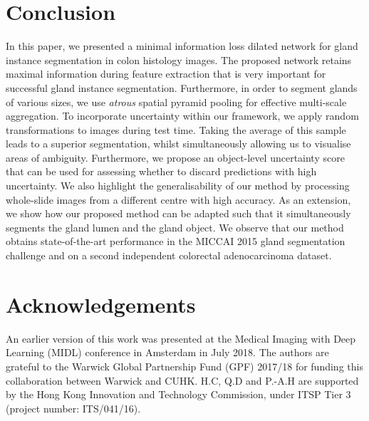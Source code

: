 \documentclass[3p]{elsarticle}
\begin{document}
\section{Conclusion}
In this paper, we presented a minimal information loss dilated network for gland instance segmentation in colon histology images. The proposed network retains maximal information during feature extraction that is very important for successful gland instance segmentation. Furthermore, in order to segment glands of various sizes, we use \textit{atrous} spatial pyramid pooling for effective multi-scale aggregation. To incorporate uncertainty within our framework, we apply random transformations to images during test time. Taking the average of this sample leads to a superior segmentation, whilst simultaneously allowing us to visualise areas of ambiguity. Furthermore, we propose an object-level uncertainty score that can be used for assessing whether to discard predictions with high uncertainty. We also highlight the generalisability of our method by processing whole-slide images from a different centre with high accuracy. As an extension, we show how our proposed method can be adapted such that it simultaneously segments the gland lumen and the gland object. 
We observe that our method obtains state-of-the-art performance in the MICCAI 2015 gland segmentation challenge and on a second independent colorectal adenocarcinoma dataset.  

\vspace{-0.5em}

\section{Acknowledgements}
An earlier version of this work was presented at the Medical Imaging with Deep Learning (MIDL) conference in Amsterdam in July 2018. The authors are grateful to the Warwick Global Partnership Fund (GPF) 2017/18 for funding this collaboration between Warwick and CUHK. H.C, Q.D and P.-A.H are supported by the Hong Kong Innovation and Technology Commission, under ITSP Tier 3 (project number: ITS/041/16).

\vspace{-0.5em}




\end{document}
